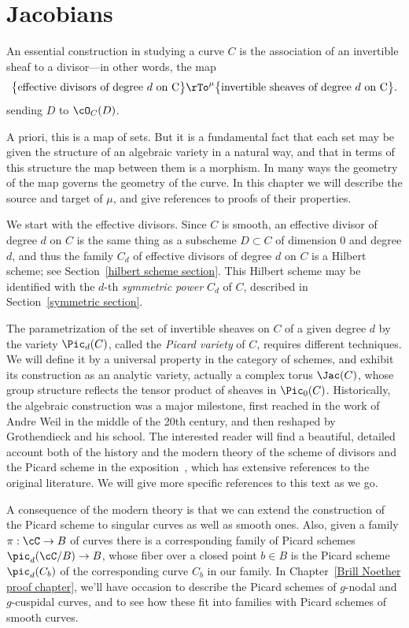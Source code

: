 

\chapter{Jacobians}\label{Jacobians chapter}\label{new Jacobians chapter}\label{JacobianChapter}


An essential construction in studying a curve $C$ is the association of an invertible sheaf to a divisor---in other words, the map
$$
\big\{ \text{effective divisors of degree $d$ on C}\big\} \rTo^\mu \big\{ \text{invertible sheaves of degree $d$ on C} \big\}.
$$
sending $D$ to $\cO_C(D)$.

A priori, this is a map of sets. But it is a fundamental fact that each set may  be given the structure of an algebraic variety in a natural way, and that in terms of this structure the map between them is a morphism. In many ways the geometry of the map governs the geometry of the curve.
In this chapter we will describe the source and target of $\mu$, and give references to proofs of their properties. 

We start with the effective divisors. Since $C$ is smooth, an effective divisor of degree $d$ on $C$ is the same thing as a subscheme $D \subset C$ of dimension 0 and degree $d$, and thus
the family $C_d$ of effective divisors of degree $d$ on $C$ is a Hilbert scheme; see Section~\ref{hilbert scheme section}. This Hilbert scheme may be identified with
the $d$-th \emph{symmetric power} $C_d$  of $C$, described in Section~\ref{symmetric section}. 

The parametrization of the set of invertible sheaves on $C$ of a given degree $d$ by the variety $\Pic_d(C)$, called the \emph{Picard variety} of $C$, requires different techniques. We will define it by a universal property in the category of schemes, and exhibit its construction as an analytic variety, actually a complex torus $\Jac(C)$, whose group structure reflects the tensor product of
sheaves in $\Pic_0(C)$.
Historically, the algebraic construction was a major milestone, first reached in the work of Andre Weil in the middle of
the 20th century, and then reshaped by Grothendieck and his school. The interested reader will find a beautiful, detailed account both of the history and the 
modern theory of the scheme of divisors and the Picard scheme in the exposition~\cite{Kleiman-PicardScheme},
which has extensive references to the original literature. We will give
more specific references to this text as we go.

A consequence of the modern theory is that we can extend the construction of the Picard scheme to singular curves as well as smooth ones. Also, given a family $\pi : \cC \to B$ of curves there is a corresponding family of Picard schemes $\pic_d(\cC/B) \to B$, whose fiber over a closed point $b\in B$ is the Picard scheme $\pic_d(C_b)$ of the corresponding curve $C_b$ in our family.
In Chapter~\ref{Brill Noether proof chapter}, we'll have occasion to describe the Picard schemes of $g$-nodal and $g$-cuspidal curves, and to see how these fit into families with Picard schemes of smooth curves.

